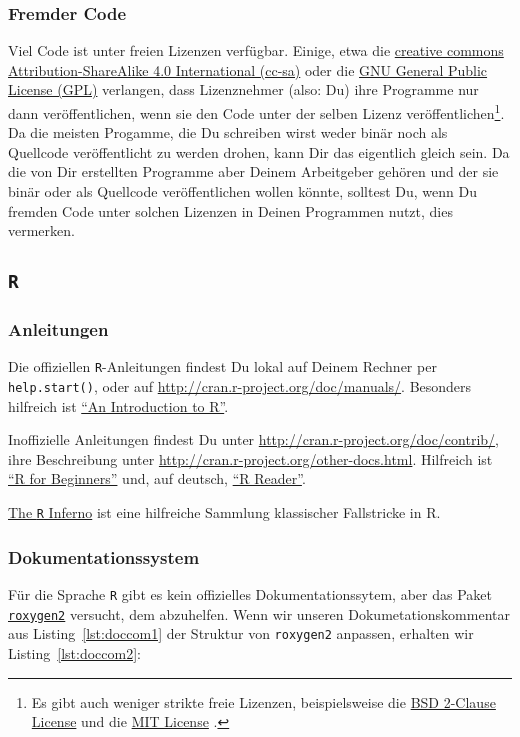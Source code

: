 \documentclass[twoside]{scrartcl}
\providecommand{\R}{\texttt{R}}
\providecommand{\code}[1]{\texttt{#1}}
\begin{document}
\subsubsection{Fremder Code\label{sec:copy_foreign}}
Viel Code ist unter freien Lizenzen verf\"u{}gbar. Einige, etwa die
\href{https://creativecommons.org/licenses/by-sa/4.0/legalcode}{creative commons
Attribution-ShareAlike 4.0 International (cc-sa)} oder die
\href{http://www.gnu.org/licenses/gpl-3.0.html}{GNU General Public License
(GPL)} verlangen, dass Lizenznehmer (also: Du) ihre Programme nur dann
ver\"o{}ffentlichen, wenn sie den Code unter der selben Lizenz
ver\"o{}ffentlichen\footnote{Es gibt auch weniger strikte freie Lizenzen,
beispielsweise die 
\href{http://opensource.org/licenses/BSD-2-Clause}{BSD 2-Clause License} und
die 
\href{http://opensource.org/licenses/MIT}{MIT License}%
. }.
Da die meisten Progamme, die Du schreiben wirst weder bin\"a{}r noch als
Quellcode ver\"o{}ffentlicht zu werden drohen, kann Dir das eigentlich gleich 
sein.
Da die von Dir erstellten Programme aber Deinem Arbeitgeber geh\"o{}ren und der
sie bin\"a{}r oder als Quellcode ver\"o{}ffentlichen wollen  k\"o{}nnte, 
solltest Du, wenn Du fremden Code unter solchen Lizenzen in Deinen Programmen
nutzt, dies vermerken.
\subsection{\R{}}
\subsubsection{Anleitungen }
Die offiziellen  \R{}-Anleitungen findest Du lokal auf Deinem Rechner per 
\code{help.start()}, oder auf \url{http://cran.r-project.org/doc/manuals/}.
Besonders hilfreich ist 
\href{http://cran.r-project.org/doc/manuals/r-release/R-intro.pdf}
{"`An Introduction to R"'}.

Inoffizielle Anleitungen findest Du unter 
\url{http://cran.r-project.org/doc/contrib/}, ihre Beschreibung unter 
\url{http://cran.r-project.org/other-docs.html}. Hilfreich ist 
\href{http://cran.r-project.org/doc/contrib/Paradis-rdebuts_en.pdf}
{"`R for Beginners"'} 
und, auf deutsch, 
\href{http://cran.r-project.org/doc/contrib/Grosz+Peters-R-Reader.pdf}
{"`R Reader"'}.

\href{http://www.burns-stat.com/pages/Tutor/R_inferno.pdf}{The \R{} Inferno} ist
eine hilfreiche Sammlung klassischer Fallstricke in R. 

\subsubsection{Dokumentationssystem}
F\"u{}r die Sprache \R{}
gibt es kein offizielles Dokumentationssytem, aber 
das Paket \href{http://cran.r-project.org/web/packages/roxygen2/index.html}
{\code{roxygen2}} versucht, dem abzuhelfen. 
Wenn wir unseren Dokumetationskommentar aus Listing~\ref{lst:doccom1} der 
Struktur von \code{roxygen2} anpassen, erhalten wir Listing~\ref{lst:doccom2}:
\end{document}
